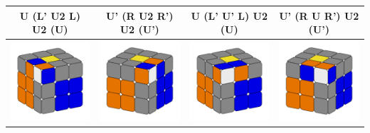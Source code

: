 \documentclass[12pt, a3paper]{article}
\newcommand{\scale}{1}
\begin{document}
\begin{center}
\begin{longtable}{c|c||c|c}
	U (L' U2 L) U2 (U) & U' (R U2 R') U2 (U') & U (L' U' L) U2 (U) & U' (R U R') U2 (U') \\
	\hline
	\hline
	\includegraphics[scale=\scale]{7_left} & \includegraphics[scale=\scale]{7_right}  &  \includegraphics[scale=\scale]{8_left} & \includegraphics[scale=\scale]{8_right} \\

\end{longtable}
\end{center}
\end{document}
